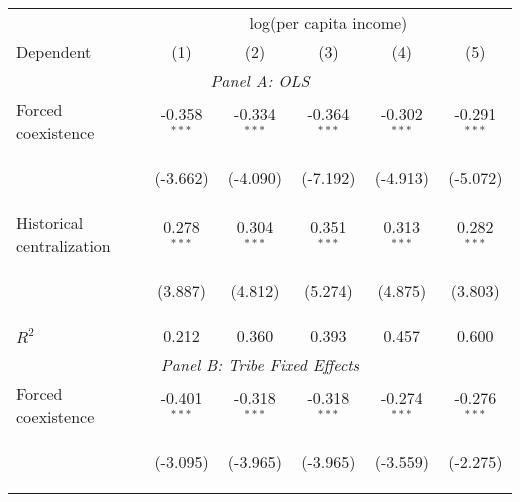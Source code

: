 \begin{center}
\begin{tabular}{lccccc}
\hline \noalign{\smallskip} & \multicolumn{5}{c}{log(per capita income)}\\
Dependent & (1) & (2) & (3) & (4) & (5)\\
\hline \multicolumn{6}{c}{\textit{Panel A: OLS}}\\
\noalign{\smallskip}\noalign{\smallskip}Forced coexistence & -0.358$ ^{***}$ & -0.334$ ^{***}$ & -0.364$ ^{***}$ & -0.302$ ^{***}$ & -0.291$ ^{***}$\\
 & \begin{footnotesize}(-3.662)\end{footnotesize} & \begin{footnotesize}(-4.090)\end{footnotesize} & \begin{footnotesize}(-7.192)\end{footnotesize} & \begin{footnotesize}(-4.913)\end{footnotesize} & \begin{footnotesize}(-5.072)\end{footnotesize}\\
\noalign{\smallskip}Historical centralization & 0.278$ ^{***}$ & 0.304$ ^{***}$ & 0.351$ ^{***}$ & 0.313$ ^{***}$ & 0.282$ ^{***}$\\
 & \begin{footnotesize}(3.887)\end{footnotesize} & \begin{footnotesize}(4.812)\end{footnotesize} & \begin{footnotesize}(5.274)\end{footnotesize} & \begin{footnotesize}(4.875)\end{footnotesize} & \begin{footnotesize}(3.803)\end{footnotesize}\\
\noalign{\smallskip}$ R^2$ & 0.212 & 0.360 & 0.393 & 0.457 & 0.600\\
\multicolumn{6}{c}{\textit{Panel B: Tribe Fixed Effects}}\\
\noalign{\smallskip}Forced coexistence & -0.401$ ^{***}$ & -0.318$ ^{***}$ & -0.318$ ^{***}$ & -0.274$ ^{***}$ & -0.276$ ^{***}$\\
 & \begin{footnotesize}(-3.095)\end{footnotesize} & \begin{footnotesize}(-3.965)\end{footnotesize} & \begin{footnotesize}(-3.965)\end{footnotesize} & \begin{footnotesize}(-3.559)\end{footnotesize} & \begin{footnotesize}(-2.275)\end{footnotesize}\\

\end{tabular}
\end{center}
